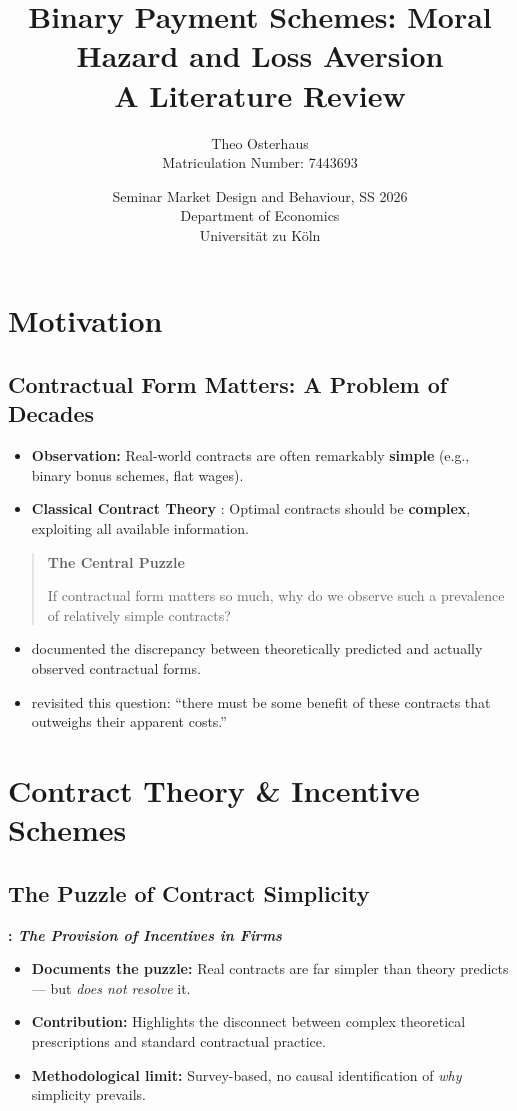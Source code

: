\documentclass[12pt,a4paper,parskip=half]{scrartcl}
\title{Binary Payment Schemes: Moral Hazard and Loss Aversion\\[0.5em]
\large A Literature Review}
\author{Theo Osterhaus \\ {\normalsize Matriculation Number: 7443693}}
\date{Seminar Market Design and Behaviour, SS 2026\\[0.2em]
Department of Economics\\ Universität zu Köln}
\newenvironment{block}[1]{%
  \begin{quote}
  \textbf{#1}\\[0.5em]
  \ignorespaces
}{%
  \end{quote}
}
\begin{document}
\maketitle

\tableofcontents
\clearpage

\section{Motivation}

\subsection*{Contractual Form Matters: A Problem of Decades}

\begin{itemize}
    \item \textbf{Observation:} Real-world contracts are often remarkably \textbf{simple} (e.g., binary bonus schemes, flat wages).
    \item \textbf{Classical Contract Theory} \parencite{Holmstroem1979}: Optimal contracts should be \textbf{complex}, exploiting all available information.
\end{itemize}

\begin{block}{The Central Puzzle}
    If contractual form matters so much, why do we observe such a prevalence of relatively simple contracts?
\end{block}

\begin{itemize}
    \item \textcite{Prendergast1999} documented the discrepancy between theoretically predicted and actually observed contractual forms.
    \item \textcite{Lazear2007} revisited this question: ``there must be some benefit of these contracts that outweighs their apparent costs.''
\end{itemize}


\section{Contract Theory \& Incentive Schemes}

\subsection*{The Puzzle of Contract Simplicity}

\textbf{\textcite{Prendergast1999}: \textit{The Provision of Incentives in Firms}}
\begin{itemize}
    \item \textbf{Documents the puzzle:} Real contracts are far simpler than theory predicts --- but \emph{does not resolve} it.
    \item \textbf{Contribution:} Highlights the disconnect between complex theoretical prescriptions and standard contractual practice.
    \item \textbf{Methodological limit:} Survey-based, no causal identification of \emph{why} simplicity prevails.
\end{itemize}
\end{document}
